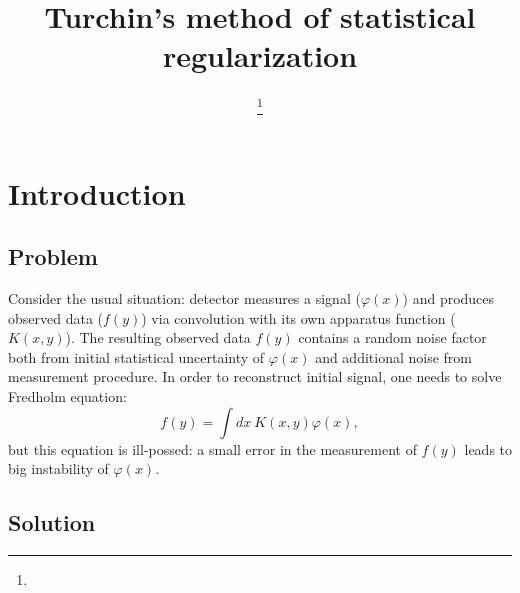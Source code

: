 \documentclass{webofc}
\begin{document}
\title{Turchin's method of statistical regularization}
%
\author{ \fnsep\thanks{} \and
      
    }
%
%
\maketitle

\section{Introduction}

\subsection{Problem}

Consider the usual situation: detector measures a signal ($\varphi(x)$) and produces observed data ($f(y)$) via convolution with its own apparatus function ($K(x,y)$). The resulting observed data $f(y)$ contains a random noise factor both from initial statistical uncertainty of $\varphi(x)$ and additional noise from measurement procedure. In order to reconstruct initial signal, one needs to solve Fredholm equation:
\begin{equation}
\label{eq-01}
    f(y) = \int dx~ K(x,y)\varphi(x),
\end{equation}
but this equation is ill-possed: a small error in the measurement of $f(y)$ leads to big instability of $\varphi(x)$. 

\subsection{Solution}
\end{document}
